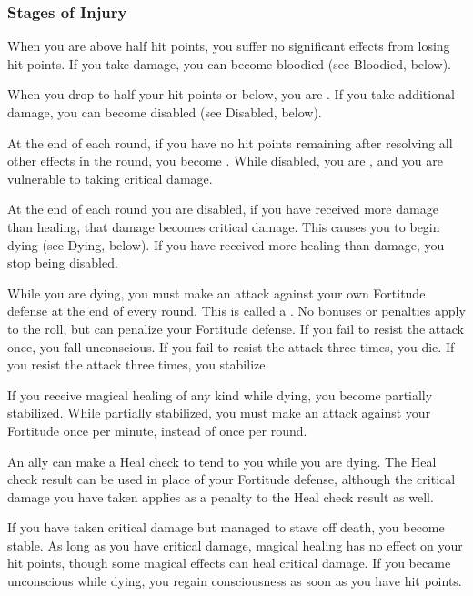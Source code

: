         \subsubsection{Stages of Injury}

             When you are above half hit points, you suffer no significant effects from losing hit points.
            If you take damage, you can become bloodied (see Bloodied, below).

             When you drop to half your hit points or below, you are \bloodied.
            If you take additional damage, you can become disabled (see Disabled, below).

            \label{Disabled} At the end of each round, if you have no hit points remaining after resolving all other effects in the round, you become \disabled.
            While disabled, you are \staggered, and you are vulnerable to taking critical damage.

            At the end of each round you are disabled, if you have received more damage than healing, that damage becomes critical damage.
            This causes you to begin dying (see Dying, below).
            If you have received more healing than damage, you stop being disabled.

            \label{Dying} While you are dying, you must make an attack against your own Fortitude defense at the end of every round.
            This is called a .
            No bonuses or penalties apply to the roll, but  can penalize your Fortitude defense.
            If you fail to resist the attack once, you fall unconscious.
            If you fail to resist the attack three times, you die.
            If you resist the attack three times, you stabilize.

            If you receive magical healing of any kind while dying, you become partially stabilized.
            While partially stabilized, you must make an attack against your Fortitude once per minute, instead of once per round.

            An ally can make a Heal check to tend to you while you are dying.
            The Heal check result can be used in place of your Fortitude defense, although the critical damage you have taken applies as a penalty to the Heal check result as well.

            \label{Stable}
            If you have taken critical damage but managed to stave off death, you become stable.
            As long as you have critical damage, magical healing has no effect on your hit points, though some magical effects can heal critical damage.
            If you became unconscious while dying, you regain consciousness as soon as you have hit points.

